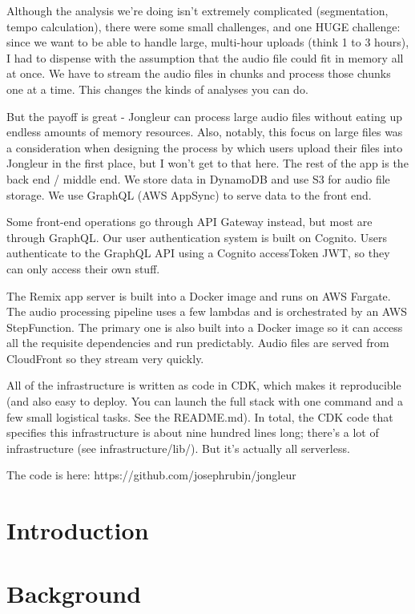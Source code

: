 \documentclass{article}
\begin{document}
Although the analysis we're doing isn't extremely complicated (segmentation, tempo calculation), there were some small challenges, and one HUGE challenge: since we want to be able to handle large, multi-hour uploads (think 1 to 3 hours), I had to dispense with the assumption that the audio file could fit in memory all at once. 
We have to stream the audio files in chunks and process those chunks one at a time.
This changes the kinds of analyses you can do.

But the payoff is great - Jongleur can process large audio files without eating up endless amounts of memory resources.
Also, notably, this focus on large files was a consideration when designing the process by which users upload their files into Jongleur in the first place, but I won't get to that here.
The rest of the app is the back end / middle end. We store data in DynamoDB and use S3 for audio file storage.
We use GraphQL (AWS AppSync) to serve data to the front end.

Some front-end operations go through API Gateway instead, but most are through GraphQL.
Our user authentication system is built on Cognito.
Users authenticate to the GraphQL API using a Cognito accessToken JWT, so they can only access their own stuff.

The Remix app server is built into a Docker image and runs on AWS Fargate.
The audio processing pipeline uses a few lambdas and is orchestrated by an AWS StepFunction.
The primary one is also built into a Docker image so it can access all the requisite dependencies and run predictably.
Audio files are served from CloudFront so they stream very quickly.

All of the infrastructure is written as code in CDK, which makes it reproducible (and also easy to deploy. You can launch the full stack with one command and a few small logistical tasks. See the README.md).
In total, the CDK code that specifies this infrastructure is about nine hundred lines long; there's a lot of infrastructure (see infrastructure/lib/).
But it's actually all serverless.

The code is here: https://github.com/josephrubin/jongleur


\section{Introduction}

\section{Background}
\end{document}
